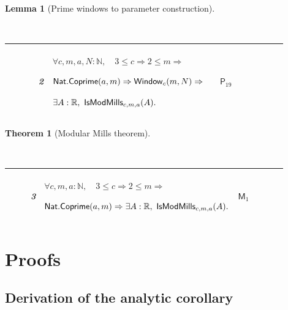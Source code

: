 \documentclass[12pt,reqno]{amsart}
\theoremstyle{blueplain}
\newtheorem{theorem}{Theorem}[section]
\newtheorem{lemma}{Lemma}[section]
\newcounter{type}
\numberwithin{equation}{section}
\begin{document}
\begin{lemma}[Prime windows to parameter construction]
\label{lem:typed-window-limit} {\ {\scriptsize \setlength{\parskip}{0pt}
\noindent 
\begin{tabular}{|@{}>{\centering\arraybackslash}m{0.10658\linewidth}|>{\centering\arraybackslash}m{0.03553\linewidth}|>{\centering\arraybackslash}m{0.52105\linewidth}|>{\centering\arraybackslash}m{0.23684\linewidth}|}
\hline
{\hypertarget{row:T2}{$\mathsf{T}$}} & {2} & {$\displaystyle \forall c,m,a,N:%
\mathbb{N},\quad3\le c\Rightarrow2\le m\Rightarrow$ \par$\displaystyle 
\hyperlink{def:Nat.Coprime}{\mathsf{Nat.Coprime} }(a,m)\Rightarrow 
\hyperlink{def:Window}{\mathsf{Window} }_c(m,N)\Rightarrow$ \par$%
\displaystyle \exists A:\mathbb{R},\ \hyperlink{def:IsModMills}{\mathsf{%
IsModMills} }_{c,m,a}(A).$} & {\hyperlink{row:P19}{$\mathsf{P}_{19}$}} \\ 
\hline
\end{tabular}%
}}
\end{lemma}

\begin{theorem}[Modular Mills theorem]
\label{thm:mod-global} {\ {\scriptsize \setlength{\parskip}{0pt} \noindent 
\begin{tabular}{|@{}>{\centering\arraybackslash}m{0.10658\linewidth}|>{\centering\arraybackslash}m{0.03553\linewidth}|>{\centering\arraybackslash}m{0.52105\linewidth}|>{\centering\arraybackslash}m{0.23684\linewidth}|}
\hline
{\hypertarget{row:T3}{$\mathsf{T}$}} & {3} & {$\displaystyle \forall c,m,a:%
\mathbb{N},\quad3\le c\Rightarrow2\le m\Rightarrow$ \par$\displaystyle 
\hyperlink{def:Nat.Coprime}{\mathsf{Nat.Coprime} }(a,m)\Rightarrow\exists A:%
\mathbb{R},\ \hyperlink{def:IsModMills}{\mathsf{IsModMills} }_{c,m,a}(A).$}
& {\hyperlink{row:M1}{$\mathsf{M}_{1}$}} \\ \hline
\end{tabular}%
}}
\end{theorem}

\section{Proofs}

\label{sec:proofs}

\subsection{Derivation of the analytic corollary}
\end{document}
